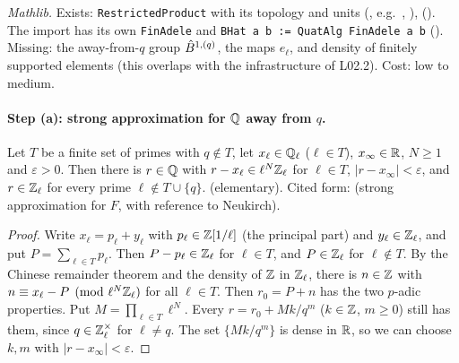 \begin{sloppypar}\noindent\emph{Mathlib.} Exists: \texttt{RestrictedProduct} with its topology and units
(, e.g.\ ,
),  ().
The import has its own \texttt{FinAdele} and \texttt{BHat a b := QuatAlg FinAdele a b} ().
Missing: the away-from-$q$ group $\hat{B}^{1,(q)}$, the maps $e_\ell$, and density of finitely supported elements (this overlaps
with the infrastructure of L02.2). Cost: low to medium.\end{sloppypar}

\paragraph{Step (a): strong approximation for $\mathbb{Q}$ away from $q$.}

\begin{lemma}[tex L02.SA(a)]\label{lem:s02-sa-step-a}
Let $T$ be a finite set of primes with $q\notin T$, let $x_\ell\in\mathbb{Q}_\ell$ ($\ell\in T$), $x_\infty\in\mathbb{R}$, $N\ge1$ and $\varepsilon>0$.
Then there is $r\in\mathbb{Q}$ with $r-x_\ell\in\ell^N\mathbb{Z}_\ell$ for $\ell\in T$, $|r-x_\infty|<\varepsilon$, and $r\in\mathbb{Z}_\ell$ for every
prime $\ell\notin T\cup\{q\}$.
\stproved{} (elementary). Cited form:  (strong approximation
for $F$, with reference to Neukirch).
\end{lemma}

\begin{proof}
Write $x_\ell=p_\ell+y_\ell$ with $p_\ell\in\mathbb{Z}[1/\ell]$ (the principal part) and $y_\ell\in\mathbb{Z}_\ell$, and put
$P=\sum_{\ell\in T}p_\ell$. Then $P-p_\ell\in\mathbb{Z}_\ell$ for $\ell\in T$, and $P\in\mathbb{Z}_\ell$ for $\ell\notin T$. By the Chinese
remainder theorem and the density of $\mathbb{Z}$ in $\mathbb{Z}_\ell$, there is $n\in\mathbb{Z}$ with $n\equiv x_\ell-P\pmod{\ell^N\mathbb{Z}_\ell}$ for all
$\ell\in T$. Then $r_0=P+n$ has the two $p$-adic properties. Put $M=\prod_{\ell\in T}\ell^N$. Every $r=r_0+Mk/q^m$
($k\in\mathbb{Z}$, $m\ge0$) still has them, since $q\in\mathbb{Z}_\ell^\times$ for $\ell\ne q$. The set $\{Mk/q^m\}$ is dense in $\mathbb{R}$, so we can
choose $k,m$ with $|r-x_\infty|<\varepsilon$.
\end{proof}

